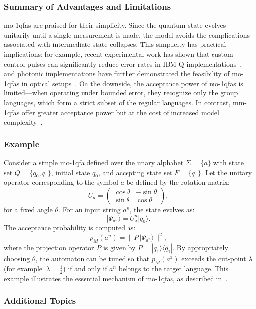 \subsubsection{Summary of Advantages and Limitations}
\glspl{mo-1qfa} are praised for their simplicity. Since the quantum state evolves unitarily until a single measurement is made, the model avoids the complications associated with intermediate state collapses. This simplicity has practical implications; for example, recent experimental work has shown that custom control pulses can significantly reduce error rates in IBM-Q implementations~\cite{lussi2024implementing}, and photonic implementations have further demonstrated the feasibility of \glspl{mo-1qfa} in optical setups~\cite{candeloro2021enhanced}. On the downside, the acceptance power of \glspl{mo-1qfa} is limited—when operating under bounded error, they recognize only the group languages, which form a strict subset of the regular languages. In contrast, \glspl{mm-1qfa} offer greater acceptance power but at the cost of increased model complexity~\cite{kondacs1997power,berzicna2001ambainis}.

\subsubsection{Example}
Consider a simple \gls{mo-1qfa} defined over the unary alphabet $\Sigma=\{a\}$ with state set $Q=\{q_0,q_1\}$, initial state $q_0$, and accepting state set $F=\{q_1\}$. Let the unitary operator corresponding to the symbol $a$ be defined by the rotation matrix:
\[
U_a = \begin{pmatrix}
\cos\theta & -\sin\theta \\
\sin\theta & \cos\theta
\end{pmatrix},
\]
for a fixed angle $\theta$. For an input string $a^n$, the state evolves as:
\[
|\Psi_{a^n}\rangle = U_a^n |q_0\rangle.
\]
The acceptance probability is computed as:
\[
p_M(a^n)=\|P\,|\Psi_{a^n}\rangle\|^2,
\]
where the projection operator $P$ is given by $P=|q_1\rangle\langle q_1|$. By appropriately choosing $\theta$, the automaton can be tuned so that $p_M(a^n)$ exceeds the cut-point $\lambda$ (for example, $\lambda=\frac{1}{2}$) if and only if $a^n$ belongs to the target language. This example illustrates the essential mechanism of \glspl{mo-1qfa}, as described in~\cite{moore2000quantum,brodsky2002characterizations}.

\subsubsection{Additional Topics}
